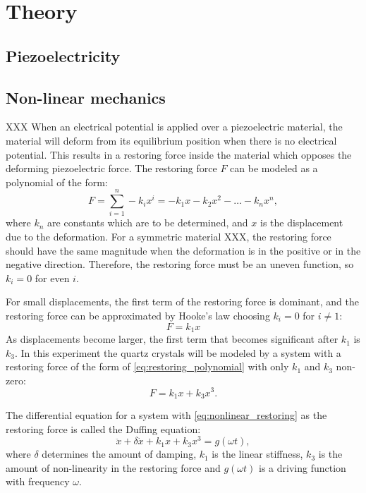 
\section{Theory}


\subsection{Piezoelectricity}


\subsection{Non-linear mechanics}
XXX When an electrical potential is applied over a piezoelectric material, the material will deform from its equilibrium position when there is no electrical potential. This results in a restoring force inside the material which opposes the deforming piezoelectric force. The restoring force $F$ can be modeled as a polynomial of the form:
\begin{equation}\label{eq:restoring_polynomial}
F = \sum\limits_{i=1}^n -k_ix^i = - k_1x - k_2x^2 - \dots - k_{n}x^{n},
\end{equation}
where $k_n$ are constants which are to be determined, and $x$ is the displacement due to the deformation. For a symmetric material XXX, the restoring force should have the same magnitude when the deformation is in the positive or in the negative direction. Therefore, the restoring force must be an uneven function, so $k_i=0$ for even $i$.

For small displacements, the first term of the restoring force is dominant, and the restoring force can be approximated by Hooke's law choosing $k_i=0$ for $i\neq 1$:
\begin{equation}
F = k_1x
\end{equation}
As displacements become larger, the first term that becomes significant after $k_1$ is $k_3$. In this experiment the quartz crystals will be modeled by a system with a restoring force of the form of \autoref{eq:restoring_polynomial} with only $k_1$ and $k_3$ non-zero:
\begin{equation}\label{eq:nonlinear_restoring}
F = k_1x + k_3x^3.
\end{equation}

The differential equation for a system with \autoref{eq:nonlinear_restoring} as the restoring force is called the Duffing equation:
\begin{equation}\label{eq:duffing}
\ddot{x} + \delta \dot{x} + k_1x + k_3x^3 = g(\omega t),
\end{equation}
where $\delta$ determines the amount of damping, $k_1$ is the linear stiffness, $k_3$ is the amount of non-linearity in the restoring force and $g(\omega t)$ is a driving function with frequency $\omega$.  

